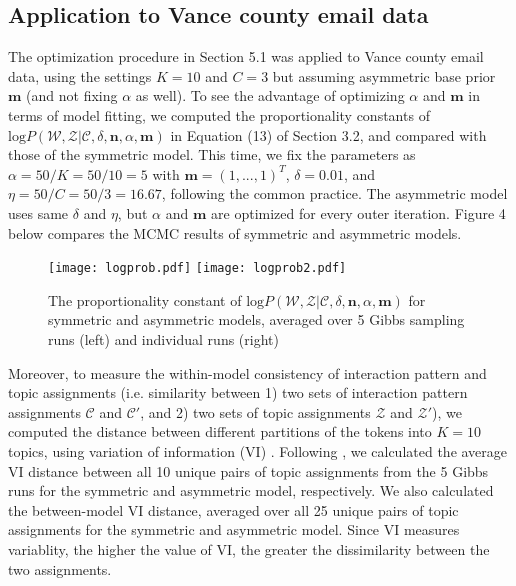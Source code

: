 \documentclass[a4paper]{article}
\begin{document}
\subsection{Application to Vance county email data}
The optimization procedure in Section 5.1 was applied to Vance county email data, using the settings $K=10$ and $C=3$ but assuming asymmetric base prior $\boldsymbol{m}$ (and not fixing $\alpha$ as well). To see the advantage of optimizing $\alpha$ and $\boldsymbol{m}$ in terms of model fitting, we computed the proportionality constants of $\mbox{log}P(\mathcal{W},\mathcal{Z}|\mathcal{C}, \delta, \boldsymbol{n}, \alpha, \boldsymbol{m})$ in Equation (13) of Section 3.2,  and compared with those of the symmetric model. This time, we fix the parameters as $\alpha=50/K=50/10=5$ with $\boldsymbol{m}=(1,...,1)^T$, $\delta=0.01$, and $\eta=50/C=50/3=16.67$, following the common practice. The asymmetric model uses same $\delta$ and $\eta$, but $\alpha$ and $\boldsymbol{m}$ are optimized for every outer iteration. Figure 4 below compares the MCMC results of symmetric and asymmetric models. 
\begin{figure}[ht]
	\centering
	\texttt{[image: logprob.pdf]} 
		\texttt{[image: logprob2.pdf]} 
	\caption{The proportionality constant of $\mbox{log}P(\mathcal{W},\mathcal{Z}|\mathcal{C}, \delta, \boldsymbol{n}, \alpha, \boldsymbol{m})$ for symmetric and asymmetric models, averaged over 5 Gibbs sampling runs (left) and individual runs (right)}
	\label{fig:logPL1}
\end{figure}
\newline Moreover, to measure the within-model consistency of interaction pattern and topic assignments (i.e. similarity between 1) two sets of interaction pattern assignments $\mathcal{C}$ and $\mathcal{C'}$, and 2) two sets of topic
assignments $\mathcal{Z}$ and $\mathcal{Z'}$), we computed the distance between different partitions
of the tokens into $K=10$ topics, using variation
of information (VI) \citep{meilua2003comparing}. Following \cite{wallach2009rethinking}, we calculated
the average VI distance between all 10 unique pairs of topic assignments from the 5 Gibbs runs for the symmetric and asymmetric model, respectively. We also calculated the between-model
VI distance, averaged over all 25 unique pairs of topic assignments for the symmetric and asymmetric model. Since VI measures variablity, the higher the value of VI, the greater the dissimilarity between the two assignments.\\
\footnotesize
\end{document}
